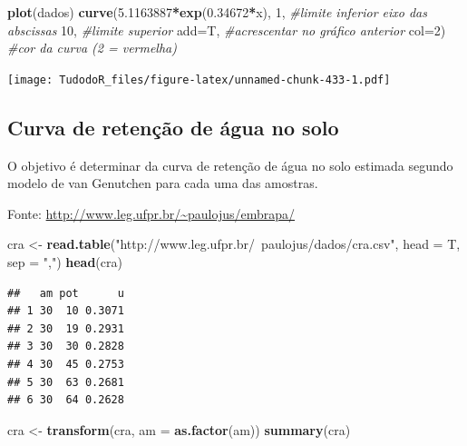 \documentclass[
]{book}
\newenvironment{Shaded}{\begin{snugshade}}{\end{snugshade}}
\newcommand{\CommentTok}[1]{\textcolor[rgb]{0.56,0.35,0.01}{\textit{#1}}}
\newcommand{\DataTypeTok}[1]{\textcolor[rgb]{0.13,0.29,0.53}{#1}}
\newcommand{\DecValTok}[1]{\textcolor[rgb]{0.00,0.00,0.81}{#1}}
\newcommand{\FloatTok}[1]{\textcolor[rgb]{0.00,0.00,0.81}{#1}}
\newcommand{\KeywordTok}[1]{\textcolor[rgb]{0.13,0.29,0.53}{\textbf{#1}}}
\newcommand{\NormalTok}[1]{#1}
\newcommand{\OperatorTok}[1]{\textcolor[rgb]{0.81,0.36,0.00}{\textbf{#1}}}
\newcommand{\StringTok}[1]{\textcolor[rgb]{0.31,0.60,0.02}{#1}}
\begin{document}
\begin{Shaded}
\begin{Highlighting}[]
\KeywordTok{plot}\NormalTok{(dados) }
\KeywordTok{curve}\NormalTok{(}\FloatTok{5.1163887}\OperatorTok{*}\KeywordTok{exp}\NormalTok{(}\FloatTok{0.34672}\OperatorTok{*}\NormalTok{x), }\DecValTok{1}\NormalTok{, }\CommentTok{#limite inferior eixo das abscissas}
      \DecValTok{10}\NormalTok{, }\CommentTok{#limite superior}
      \DataTypeTok{add=}\NormalTok{T, }\CommentTok{#acrescentar no gráfico anterior }
      \DataTypeTok{col=}\DecValTok{2}\NormalTok{) }\CommentTok{#cor da curva (2 = vermelha)}
\end{Highlighting}
\end{Shaded}

\texttt{[image: TudodoR\_files/figure-latex/unnamed-chunk-433-1.pdf]}

\hypertarget{curva-de-retenuxe7uxe3o-de-uxe1gua-no-solo}{%
\subsection{Curva de retenção de água no solo}\label{curva-de-retenuxe7uxe3o-de-uxe1gua-no-solo}}

O objetivo é determinar da curva de retenção de água no solo estimada segundo modelo de van Genutchen para cada uma das amostras.

Fonte: \url{http://www.leg.ufpr.br/~paulojus/embrapa/}

\begin{Shaded}
\begin{Highlighting}[]
\NormalTok{cra <-}\StringTok{ }\KeywordTok{read.table}\NormalTok{(}\StringTok{"http://www.leg.ufpr.br/~paulojus/dados/cra.csv"}\NormalTok{, }\DataTypeTok{head =}\NormalTok{ T, }\DataTypeTok{sep =} \StringTok{","}\NormalTok{) }
\KeywordTok{head}\NormalTok{(cra)}
\end{Highlighting}
\end{Shaded}

\begin{verbatim}
##   am pot      u
## 1 30  10 0.3071
## 2 30  19 0.2931
## 3 30  30 0.2828
## 4 30  45 0.2753
## 5 30  63 0.2681
## 6 30  64 0.2628
\end{verbatim}

\begin{Shaded}
\begin{Highlighting}[]
\NormalTok{cra <-}\StringTok{ }\KeywordTok{transform}\NormalTok{(cra, }\DataTypeTok{am =} \KeywordTok{as.factor}\NormalTok{(am)) }
\KeywordTok{summary}\NormalTok{(cra)}
\end{Highlighting}
\end{Shaded}
\end{document}
